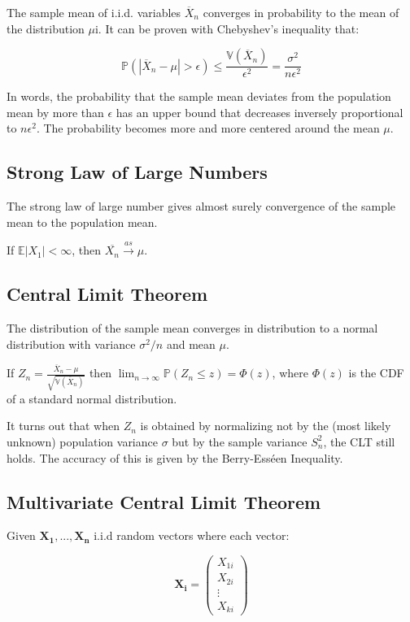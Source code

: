 The sample mean of i.i.d. variables  $\overline{X}_n$ converges in probability to the mean of the distribution $\mu$i. It can be proven with Chebyshev's inequality that:

\begin{equation}
\mathbb{P}(|\overline{X}_n-\mu|>\epsilon) \leq \frac{\mathbb{V}(\overline{X}_n)}{\epsilon^2}=\frac{\sigma^2}{n \epsilon^2}
\end{equation}

In words, the probability that the sample mean deviates from the population mean by more than $\epsilon$ has an upper bound that decreases inversely proportional to $n\epsilon^2$. The probability becomes more and more centered around the mean $\mu$.

\subsection{Strong Law of Large Numbers}
The strong law of large number gives almost surely convergence of the sample mean to the population mean.

If $\mathbb{E}|X_1| < \infty$, then $\overline{X_n}\xrightarrow{as}\mu$.



\subsection{Central Limit Theorem}
The distribution of the sample mean converges in distribution to a normal distribution with variance $\sigma^2/n$ and mean $\mu$.

If $Z_n = \frac{\overline{X}_n - \mu}{\sqrt{\mathbb{V}(\overline{X}_n)}}$ then $\lim_{n\rightarrow \infty} \mathbb{P}(Z_n \leq z) = \Phi(z)$, where $\Phi(z)$ is the CDF of a standard normal distribution. 

It turns out that when $Z_n$ is obtained by normalizing not by the (most likely unknown) population variance $\sigma$ but by the sample variance $S_n^2$, the CLT still holds. The accuracy of this is given by the Berry-Ess\'een Inequality.


\subsection{Multivariate Central Limit Theorem}
Given $\mathbf{X_1, ... ,X_n}$ i.i.d random vectors where each vector:

\begin{equation}
\mathbf{X_i} = \left(\begin{array}{c}X_{1i}\\ X_{2i} \\ \vdots \\ X_{ki} \end{array}\right)
\end{equation}


